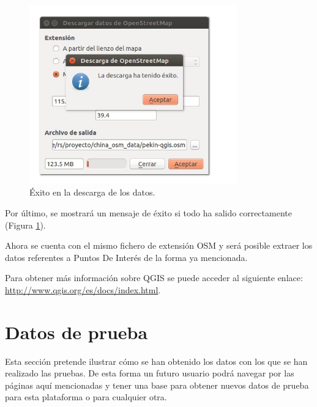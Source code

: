\begin{figure}[h]
  \centering
    \includegraphics[width=0.8\textwidth]{../img/qgis/exito.jpg}
  \caption{Éxito en la descarga de los datos.}
  \label{exito}
\end{figure}
Por último, se mostrará un mensaje de éxito si todo ha salido correctamente (Figura \ref{exito}).

Ahora se cuenta con el mismo fichero de extensión OSM y será posible extraer los datos referentes a Puntos De Interés de la forma ya mencionada.

Para obtener más información sobre QGIS se puede acceder al siguiente enlace: \url{http://www.qgis.org/es/docs/index.html}.



\section{Datos de prueba}
Esta sección pretende ilustrar cómo se han obtenido los datos con los que se han realizado las pruebas. De esta forma un futuro usuario podrá navegar por las páginas aquí mencionadas y tener una base para obtener nuevos datos de prueba para esta plataforma o para cualquier otra.


